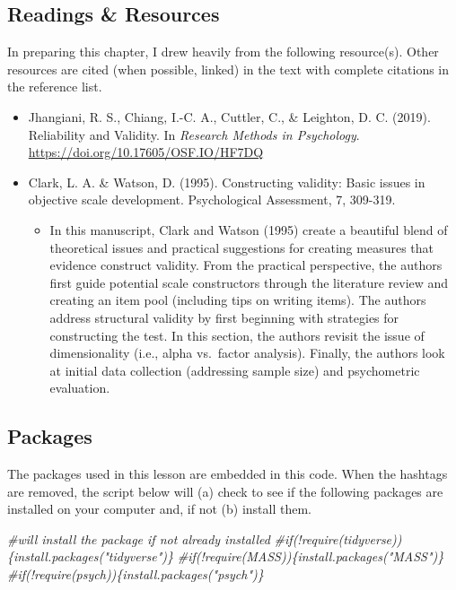 \documentclass[
  english,
]{book}
\newenvironment{Shaded}{\begin{snugshade}}{\end{snugshade}}
\newcommand{\CommentTok}[1]{\textcolor[rgb]{0.56,0.35,0.01}{\textit{#1}}}
\providecommand{\tightlist}{%
  \setlength{\itemsep}{0pt}\setlength{\parskip}{0pt}}
\begin{document}
\hypertarget{readings-resources-2}{%
\subsection{Readings \& Resources}\label{readings-resources-2}}

In preparing this chapter, I drew heavily from the following resource(s). Other resources are cited (when possible, linked) in the text with complete citations in the reference list.

\begin{itemize}
\tightlist
\item
  Jhangiani, R. S., Chiang, I.-C. A., Cuttler, C., \& Leighton, D. C. (2019). Reliability and Validity. In \emph{Research Methods in Psychology}. \url{https://doi.org/10.17605/OSF.IO/HF7DQ}
\item
  Clark, L. A. \& Watson, D. (1995). Constructing validity: Basic issues in objective scale development. Psychological Assessment, 7, 309-319.

  \begin{itemize}
  \tightlist
  \item
    In this manuscript, Clark and Watson (1995) create a beautiful blend of theoretical issues and practical suggestions for creating measures that evidence construct validity. From the practical perspective, the authors first guide potential scale constructors through the literature review and creating an item pool (including tips on writing items). The authors address structural validity by first beginning with strategies for constructing the test. In this section, the authors revisit the issue of dimensionality (i.e., alpha vs.~factor analysis). Finally, the authors look at initial data collection (addressing sample size) and psychometric evaluation.
  \end{itemize}
\end{itemize}

\hypertarget{packages-2}{%
\subsection{Packages}\label{packages-2}}

The packages used in this lesson are embedded in this code. When the hashtags are removed, the script below will (a) check to see if the following packages are installed on your computer and, if not (b) install them.

\begin{Shaded}
\begin{Highlighting}[]
\CommentTok{\#will install the package if not already installed}
\CommentTok{\#if(!require(tidyverse))\{install.packages("tidyverse")\}}
\CommentTok{\#if(!require(MASS))\{install.packages("MASS")\}}
\CommentTok{\#if(!require(psych))\{install.packages("psych")\}}
\end{Highlighting}
\end{Shaded}
\end{document}

